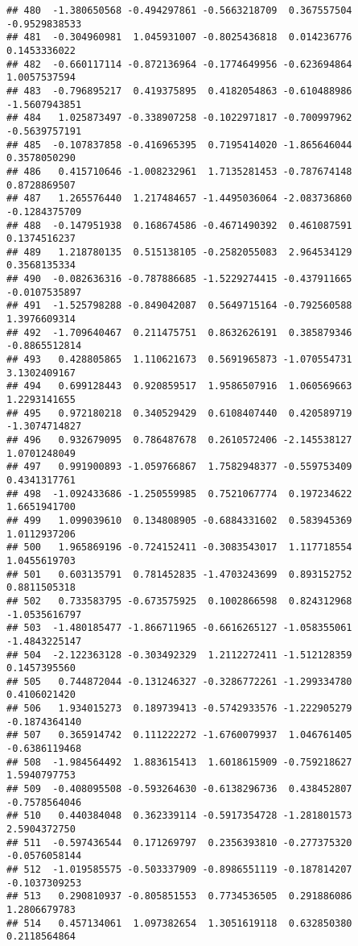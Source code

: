 \documentclass[
]{article}
\begin{document}
\begin{verbatim}
## 480  -1.380650568 -0.494297861 -0.5663218709  0.367557504 -0.9529838533
## 481  -0.304960981  1.045931007 -0.8025436818  0.014236776  0.1453336022
## 482  -0.660117114 -0.872136964 -0.1774649956 -0.623694864  1.0057537594
## 483  -0.796895217  0.419375895  0.4182054863 -0.610488986 -1.5607943851
## 484   1.025873497 -0.338907258 -0.1022971817 -0.700997962 -0.5639757191
## 485  -0.107837858 -0.416965395  0.7195414020 -1.865646044  0.3578050290
## 486   0.415710646 -1.008232961  1.7135281453 -0.787674148  0.8728869507
## 487   1.265576440  1.217484657 -1.4495036064 -2.083736860 -0.1284375709
## 488  -0.147951938  0.168674586 -0.4671490392  0.461087591  0.1374516237
## 489   1.218780135  0.515138105 -0.2582055083  2.964534129  0.3568135334
## 490  -0.082636316 -0.787886685 -1.5229274415 -0.437911665 -0.0107535897
## 491  -1.525798288 -0.849042087  0.5649715164 -0.792560588  1.3976609314
## 492  -1.709640467  0.211475751  0.8632626191  0.385879346 -0.8865512814
## 493   0.428805865  1.110621673  0.5691965873 -1.070554731  3.1302409167
## 494   0.699128443  0.920859517  1.9586507916  1.060569663  1.2293141655
## 495   0.972180218  0.340529429  0.6108407440  0.420589719 -1.3074714827
## 496   0.932679095  0.786487678  0.2610572406 -2.145538127  1.0701248049
## 497   0.991900893 -1.059766867  1.7582948377 -0.559753409  0.4341317761
## 498  -1.092433686 -1.250559985  0.7521067774  0.197234622  1.6651941700
## 499   1.099039610  0.134808905 -0.6884331602  0.583945369  1.0112937206
## 500   1.965869196 -0.724152411 -0.3083543017  1.117718554  1.0455619703
## 501   0.603135791  0.781452835 -1.4703243699  0.893152752  0.8811505318
## 502   0.733583795 -0.673575925  0.1002866598  0.824312968 -1.0535616797
## 503  -1.480185477 -1.866711965 -0.6616265127 -1.058355061 -1.4843225147
## 504  -2.122363128 -0.303492329  1.2112272411 -1.512128359  0.1457395560
## 505   0.744872044 -0.131246327 -0.3286772261 -1.299334780  0.4106021420
## 506   1.934015273  0.189739413 -0.5742933576 -1.222905279 -0.1874364140
## 507   0.365914742  0.111222272 -1.6760079937  1.046761405 -0.6386119468
## 508  -1.984564492  1.883615413  1.6018615909 -0.759218627  1.5940797753
## 509  -0.408095508 -0.593264630 -0.6138296736  0.438452807 -0.7578564046
## 510   0.440384048  0.362339114 -0.5917354728 -1.281801573  2.5904372750
## 511  -0.597436544  0.171269797  0.2356393810 -0.277375320 -0.0576058144
## 512  -1.019585575 -0.503337909 -0.8986551119 -0.187814207 -0.1037309253
## 513   0.290810937 -0.805851553  0.7734536505  0.291886086  1.2806679783
## 514   0.457134061  1.097382654  1.3051619118  0.632850380  0.2118564864

\end{verbatim}
\end{document}
